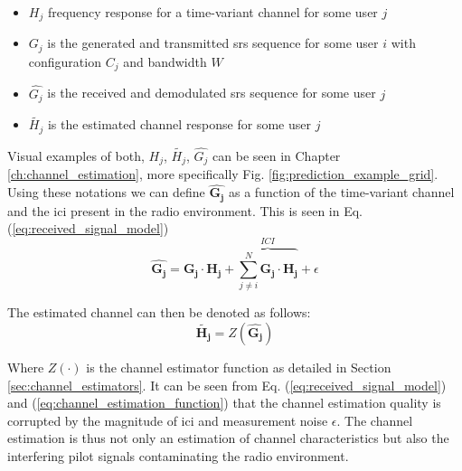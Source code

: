 \begin{itemize}
    \item $H_j$ frequency response for a time-variant channel for some user $j$
    \item $G_j$ is the generated and transmitted \gls{srs} sequence for some user $i$ with configuration $C_j$ and bandwidth $W$
    \item $\hat{G_j}$ is the received and demodulated \gls{srs} sequence for some user $j$
    \item $\widetilde{H_j}$ is the estimated channel response for some user $j$
\end{itemize}

Visual examples of both, $H_j$, $\widetilde{H_j}$, $\hat{G_j}$ can be seen in Chapter \ref{ch:channel_estimation}, more specifically Fig. \ref{fig:prediction_example_grid}. Using these notations we can define $\hat{\mathbf{G_j}}$ as a function of the time-variant channel and the \gls{ici} present in the radio environment. This is seen in Eq. (\ref{eq:received_signal_model})
\begin{equation}\label{eq:received_signal_model}
    \hat{\mathbf{G_j}} = \mathbf{G_j} \cdot \mathbf{H_j} + \overbrace{\sum_{j \neq i}^N \mathbf{G_j} \cdot \mathbf{H_j}}^{ICI} + \epsilon
\end{equation}

The estimated channel can then be denoted as follows:
\begin{equation}\label{eq:channel_estimation_function}
    \widetilde{\mathbf{H_j}} = Z(\mathbf{\hat{G_j}}) 
\end{equation}

Where $Z(\cdot)$ is the channel estimator function as detailed in Section \ref{sec:channel_estimators}. It can be seen from Eq. (\ref{eq:received_signal_model}) and (\ref{eq:channel_estimation_function}) that the channel estimation quality is corrupted by the magnitude of \gls{ici} and measurement noise $\epsilon$. The channel estimation is thus not only an estimation of channel characteristics but also the interfering pilot signals contaminating the radio environment.

